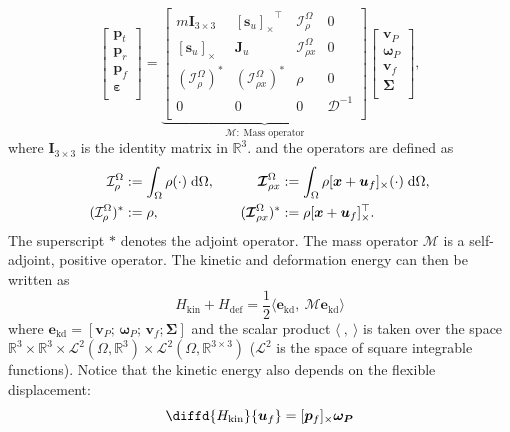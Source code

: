 \documentclass{svjour3}                     %
\newcommand{\crmat}[1]{\ensuremath{[#1]_{\times}}}
\begin{document}
\begin{equation}
\label{eq:mass_op}
\begin{bmatrix}
\bm{p}_t \\ \bm{p}_r \\ \bm{p}_f \\ \bm\varepsilon \\
\end{bmatrix} = 
\underbrace{\begin{bmatrix}
	m \bm{I}_{3\times 3} & \crmat{\bm{s}_u}^\top & \mathcal{I}_\rho^{\Omega} & 0 \\
	\crmat{\bm{s}_u} & \bm{J}_u & \bm{\mathcal{I}}_{\rho x}^{\Omega} & 0  \\
	(\mathcal{I}_\rho^{\Omega})^* & (\bm{\mathcal{I}}_{\rho x}^{\Omega})^* & \rho & 0  \\
	0 & 0 & 0 & \bm{\mathcal{D}}^{-1} \\
	\end{bmatrix}}_{\bm{\mathcal{M}}: \; \text{Mass operator}}
\begin{bmatrix}
\bm{v}_P \\ \bm{\omega}_P  \\ \bm{v}_f  \\ \bm\Sigma \\
\end{bmatrix},
\end{equation}
where $\bm{I}_{3\times 3}$ is the identity matrix in $\mathbb{R}^3$. and the operators are defined as
\begin{equation*}
\begin{aligned}
\mathcal{I}_\rho^\Omega &:=\int_{\Omega} \rho (\cdot) \d{\Omega}, \\
(\mathcal{I}_\rho^{\Omega})^* &:= \rho, \\
\end{aligned} \qquad
\begin{aligned} 
\bm{\mathcal{I}}_{\rho x}^{\Omega} &:= \int_\Omega \rho \crmat{\bm{x}+\bm{u}_f} (\cdot) \d{\Omega}, \\
(\bm{\mathcal{I}}_{\rho x}^{\Omega})^* &:= \rho \crmat{\bm{x}+\bm{u}_f}^\top. \\
\end{aligned}
\end{equation*}
The superscript $*$ denotes the adjoint operator. The mass operator $\bm{\mathcal{M}}$ is a self-adjoint, positive operator. The kinetic and deformation energy can then be written as
\begin{equation}
H_{\text{kin}} + H_{\text{def}} = \frac{1}{2} \langle \bm{e}_{\text{kd}}, \ \bm{\mathcal{M}} \bm{e}_{\text{kd}} \rangle
\end{equation}
where $\bm{e}_{\text{kd}} = [\bm{v}_P; \, \bm{\omega}_P; \, \bm{v}_f; \bm{\Sigma}]$ and the scalar product $\langle \ , \ \rangle$ is taken over the space $\mathbb{R}^3 \times \mathbb{R}^3 \times \mathscr{L}^2(\Omega, \mathbb{R}^3) \times \mathscr{L}^2(\Omega, \mathbb{R}^{3\times 3})$ ($\mathscr{L}^2$ is the space of square integrable functions). Notice that the kinetic energy also depends on the flexible displacement:
\[
\diffd{H_{\text{kin}}}{\bm{u}_f} = \crmat{\bm{p}_f} \bm{\omega_{P}}
\]
\end{document}
